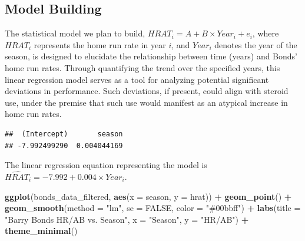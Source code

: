 \documentclass[
]{article}
\newenvironment{Shaded}{\begin{snugshade}}{\end{snugshade}}
\newcommand{\AttributeTok}[1]{\textcolor[rgb]{0.13,0.29,0.53}{#1}}
\newcommand{\ConstantTok}[1]{\textcolor[rgb]{0.56,0.35,0.01}{#1}}
\newcommand{\FunctionTok}[1]{\textcolor[rgb]{0.13,0.29,0.53}{\textbf{#1}}}
\newcommand{\NormalTok}[1]{#1}
\newcommand{\OtherTok}[1]{\textcolor[rgb]{0.56,0.35,0.01}{#1}}
\newcommand{\SpecialCharTok}[1]{\textcolor[rgb]{0.81,0.36,0.00}{\textbf{#1}}}
\newcommand{\StringTok}[1]{\textcolor[rgb]{0.31,0.60,0.02}{#1}}
\begin{document}
\hypertarget{model-building}{%
\subsection{Model Building}\label{model-building}}

The statistical model we plan to build,
\(HRAT_{i} = A + B \times Year_{i} + e_{i}\), where \(HRAT_{i}\)
represents the home run rate in year \(i\), and \(Year_{i}\) denotes the
year of the season, is designed to elucidate the relationship between
time (years) and Bonds' home run rates. Through quantifying the trend
over the specified years, this linear regression model serves as a tool
for analyzing potential significant deviations in performance. Such
deviations, if present, could align with steroid use, under the premise
that such use would manifest as an atypical increase in home run rates.

\begin{Shaded}
\end{Shaded}

\begin{verbatim}
##  (Intercept)       season 
## -7.992499290  0.004044169
\end{verbatim}

The linear regression equation representing the model is
\(\hat{HRAT_{i}} = -7.992 + 0.004 \times Year_{i}\).

\begin{Shaded}
\begin{Highlighting}[]
\FunctionTok{ggplot}\NormalTok{(bonds\_data\_filtered, }\FunctionTok{aes}\NormalTok{(}\AttributeTok{x =}\NormalTok{ season, }\AttributeTok{y =}\NormalTok{ hrat)) }\SpecialCharTok{+}
  \FunctionTok{geom\_point}\NormalTok{() }\SpecialCharTok{+}
  \FunctionTok{geom\_smooth}\NormalTok{(}\AttributeTok{method =} \StringTok{"lm"}\NormalTok{, }\AttributeTok{se =} \ConstantTok{FALSE}\NormalTok{, }\AttributeTok{color =} \StringTok{"\#00bbff"}\NormalTok{) }\SpecialCharTok{+}
  \FunctionTok{labs}\NormalTok{(}\AttributeTok{title =} \StringTok{"Barry Bonds HR/AB vs. Season"}\NormalTok{, }\AttributeTok{x =} \StringTok{"Season"}\NormalTok{, }\AttributeTok{y =} \StringTok{"HR/AB"}\NormalTok{) }\SpecialCharTok{+}
  \FunctionTok{theme\_minimal}\NormalTok{()}
\end{Highlighting}
\end{Shaded}
\end{document}

